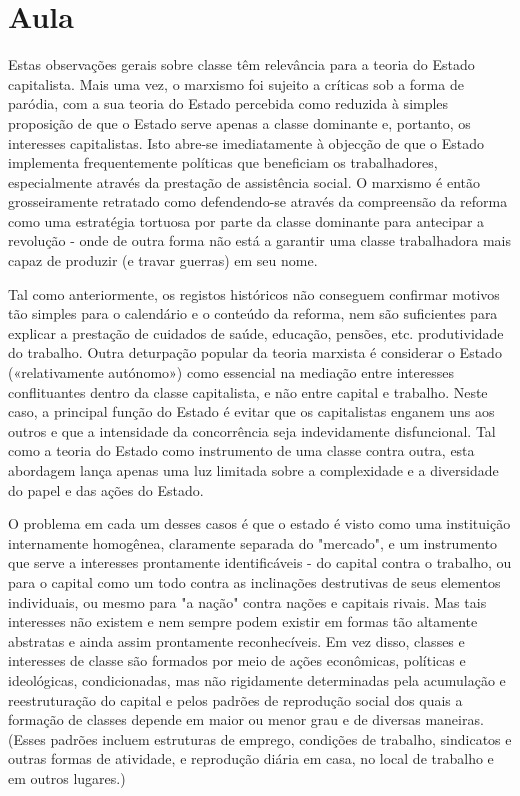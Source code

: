 \section{Aula}
 \par 
Estas observações gerais sobre classe têm relevância para a teoria do Estado capitalista. Mais uma vez, o marxismo foi sujeito a críticas sob a forma de paródia, com a sua teoria do Estado percebida como reduzida à simples proposição de que o Estado serve apenas a classe dominante e, portanto, os interesses capitalistas. Isto abre-se imediatamente à objecção de que o Estado implementa frequentemente políticas que beneficiam os trabalhadores, especialmente através da prestação de assistência social. O marxismo é então grosseiramente retratado como defendendo-se através da compreensão da reforma como uma estratégia tortuosa por parte da classe dominante para antecipar a revolução - onde de outra forma não está a garantir uma classe trabalhadora mais capaz de produzir (e travar guerras) em seu nome.
 \par 
Tal como anteriormente, os registos históricos não conseguem confirmar motivos tão simples para o calendário e o conteúdo da reforma, nem são suficientes para explicar a prestação de cuidados de saúde, educação, pensões, etc. produtividade do trabalho. Outra deturpação popular da teoria marxista é considerar o Estado («relativamente autónomo») como essencial na mediação entre interesses conflituantes dentro da classe capitalista, e não entre capital e trabalho. Neste caso, a principal função do Estado é evitar que os capitalistas enganem uns aos outros e que a intensidade da concorrência seja indevidamente disfuncional. Tal como a teoria do Estado como instrumento de uma classe contra outra, esta abordagem lança apenas uma luz limitada sobre a complexidade e a diversidade do papel e das ações do Estado.
 \par 
O problema em cada um desses casos é que o estado é visto como uma instituição internamente homogênea, claramente separada do "mercado", e um instrumento que serve a interesses prontamente identificáveis ​​- do capital contra o trabalho, ou para o capital como um todo contra as inclinações destrutivas de seus elementos individuais, ou mesmo para "a nação" contra nações e capitais rivais. Mas tais interesses não existem e nem sempre podem existir em formas tão altamente abstratas e ainda assim prontamente reconhecíveis. Em vez disso, classes e interesses de classe são formados por meio de ações econômicas, políticas e ideológicas, condicionadas, mas não rigidamente determinadas pela acumulação e reestruturação do capital e pelos padrões de reprodução social dos quais a formação de classes depende em maior ou menor grau e de diversas maneiras. (Esses padrões incluem estruturas de emprego, condições de trabalho, sindicatos e outras formas de atividade, e reprodução diária em casa, no local de trabalho e em outros lugares.)
